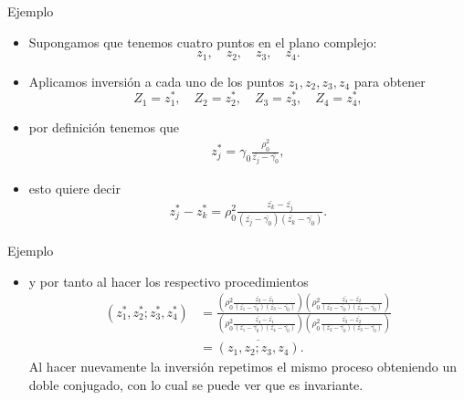 \documentclass{beamer}
\begin{document}
\begin{frame}{Ejemplo}
    \begin{itemize}
        \item Supongamos que tenemos cuatro puntos en el plano complejo:
            \begin{equation*}
                z_1,\quad
                z_2, \quad
                z_3, \quad
                z_4.
            \end{equation*}
            \item Aplicamos inversión a cada uno de los puntos $z_1, z_2, z_3, z_4$ para obtener
            \begin{equation*}
                Z_1=z_1^*, \quad Z_2=z_2^*, \quad Z_3=z_3^*, \quad Z_4=z_4^*,    
            \end{equation*}
            \item por definición tenemos que 
            \begin{align*}
                z^*_j=\gamma_0\frac{\rho_0^2}{\bar{z_j}-\bar{\gamma_0}},
            \end{align*}
            \item esto quiere decir
            \begin{align*}
                z^*_j-z^*_k=\rho_0^2\frac{\bar{z_k}-\bar{z_j}}{(\bar{z_j}-\bar{\gamma_0})(\bar{z_k}-\bar{\gamma_0})}.
            \end{align*}
    \end{itemize}
\end{frame}

\begin{frame}{Ejemplo}
    \begin{itemize}
        \item y por tanto al hacer los respectivo procedimientos
            \begin{align*}
                (z_1^*,z_2^*;z_3^*,z_4^*)
                &=\frac{\left(\rho_0^2\frac{\bar{z_3}-\bar{z_1}}{(\bar{z_1}-\bar{\gamma_0})(\bar{z_3}-\bar{\gamma_0})}\right)\left(\rho_0^2\frac{\bar{z_4}-\bar{z_2}}{(\bar{z_2}-\bar{\gamma_0})(\bar{z_4}-\bar{\gamma_0})}\right)}{\left(\rho_0^2\frac{\bar{z_4}-\bar{z_1}}{(\bar{z_1}-\bar{\gamma_0})(\bar{z_4}-\bar{\gamma_0})}\right)\left(\rho_0^2\frac{\bar{z_3}-\bar{z_2}}{(\bar{z_2}-\bar{\gamma_0})(\bar{z_3}-\bar{\gamma_0})}\right)}\\
                &=\overline{(z_1,z_2;z_3,z_4)}.
            \end{align*}
            Al hacer nuevamente la inversión repetimos el mismo proceso obteniendo un doble conjugado, con lo cual se puede ver que es invariante.
    \end{itemize}
\end{frame}
\end{document}

